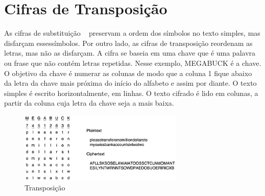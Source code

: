 \section {Cifras de Transposição}

As cifras de substituição ~\cite{tanenbaum} preservam a ordem dos símbolos no texto simples, mas disfarçam essessímbolos. Por outro lado, as cifras de transposição reordenam as letras, mas não as disfarçam.  A cifra se baseia em uma chave que é uma palavra ou frase que não contém letras repetidas. Nesse exemplo, MEGABUCK é a chave. O objetivo da chave é numerar as colunas de modo que a coluna 1 fique abaixo da letra da chave mais próxima do início do alfabeto e assim por diante. O texto simples é escrito horizontalmente, em linhas. O texto cifrado é lido em colunas, a partir da coluna cuja letra da chave seja a mais baixa.


\begin{figure}
	\begin{center}
		\includegraphics[width=0.7\textwidth]{criptografia2}
	\end{center}
	\caption{Transposição ~\cite{tanenbaum}}
	\label{fig:criptografia2}
\end{figure}

